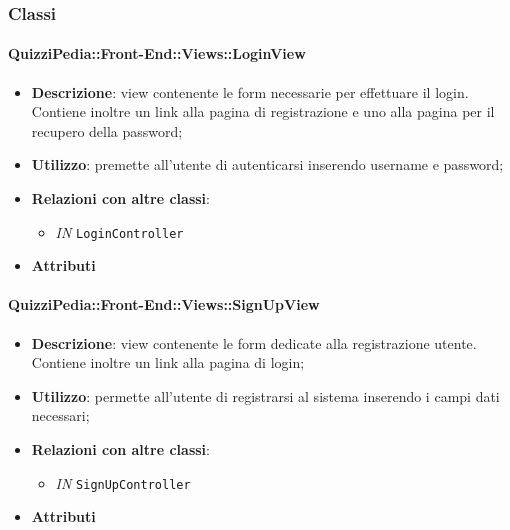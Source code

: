 \subsubsection{Classi}

\paragraph{QuizziPedia::Front-End::Views::LoginView}
\begin{itemize}
	\item \textbf{Descrizione}: view contenente le form necessarie per effettuare il login. Contiene inoltre un link alla pagina di registrazione e uno alla pagina per il recupero della password;
	\item \textbf{Utilizzo}: premette all'utente di autenticarsi inserendo username e password;
	\item \textbf{Relazioni con altre classi}:
	\begin{itemize}
		\item \textit{IN} \texttt{LoginController} \\ 
	\end{itemize}
	\item \textbf{Attributi}
\end{itemize}

\paragraph{QuizziPedia::Front-End::Views::SignUpView}
\begin{itemize}
	\item \textbf{Descrizione}: view contenente le form dedicate alla registrazione utente. Contiene inoltre un link alla pagina di login;
	\item \textbf{Utilizzo}: permette all'utente di registrarsi al sistema inserendo i campi dati necessari;
	\item \textbf{Relazioni con altre classi}:
	\begin{itemize}
		\item \textit{IN} \texttt{SignUpController} \\
	\end{itemize}
	\item \textbf{Attributi}
\end{itemize}

